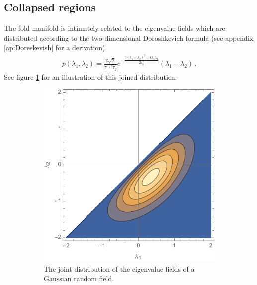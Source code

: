 \documentclass[a4paper, 11pt]{article}
\begin{document}
\subsection{Collapsed regions}
The fold manifold is intimately related to the eigenvalue fields which are distributed according to the two-dimensional Doroshkevich formula (see appendix \ref{ap:Doreskevish} for a derivation)
\begin{align}
p(\lambda_1, \lambda_2) = \frac{2\sqrt{2}}{\pi^{1/2}\tau_2^3} e^{-\frac{3(\lambda_1+\lambda_2)^2 - 8 \lambda_1 \lambda_2}{2 \tau_2^2}}(\lambda_1 - \lambda_2)\,.
\end{align}
See figure \ref{fig:Doroshkevich} for an illustration of this joined distribution.
\begin{figure}
\centering
\begin{subfigure}[b]{0.4\textwidth}
\includegraphics[width=\textwidth]{Doroshkevich}
\caption{The joint distribution of the eigenvalue fields of a Gaussian random field.\\}
\label{fig:Doroshkevich}
\end{subfigure}
\begin{subfigure}[b]{0.4\textwidth}

\end{subfigure}
\end{figure}
\end{document}
